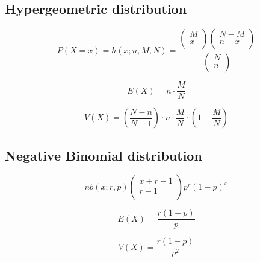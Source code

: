 \documentclass[UTF8]{ctexart}
\numberwithin{equation}{subsection}%
\begin{document}
	\subsection{Hypergeometric distribution}
	\begin{Large}
		\begin{equation}
			P(X=x)=h(x;n,M,N)=\frac{
				\left( \begin{array}{c}
					M\\
					x\\
				\end{array} \right)
				\left( \begin{array}{c}
					N-M\\
					n-x\\
				\end{array} \right)
				}{
				\left( \begin{array}{c}
					N\\
					n\\
				\end{array} \right)
			     }		     
	\end{equation}		
	\end{Large}
	\begin{Large}
		\begin{equation}
		E(X) = n\cdot \frac{M}{N}
		\end{equation}		
	\end{Large}
	\begin{Large}
		\begin{equation}
		V(X) = \left( \frac{N-n}{N-1} \right) \cdot n \cdot \frac{M}{N}\cdot\left( 1- \frac{M}{N} \right)
		\end{equation}		
	\end{Large}
	\subsection{Negative Binomial distribution}
	\begin{Large}
		\begin{equation}
			nb(x;r,p)
			\left( \begin{array}{c}
				x+r-1\\
				r-1\\
			\end{array} \right)p^{r}(1-p)^x
		\end{equation}		
	\end{Large}
	\begin{Large}
		\begin{equation}
			E(X) = \frac{r(1-p)}{p}
		\end{equation}		
	\end{Large}
	\begin{Large}
		\begin{equation}
			V(X) = \frac{r(1-p)}{p^2}
		\end{equation}		
	\end{Large}
\end{document}
